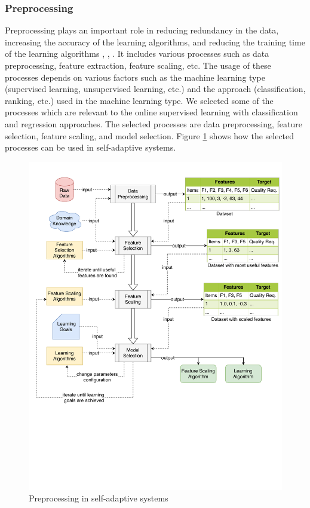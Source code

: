 \documentclass[a4paper,12pt]{article}
\begin{document}
\subsubsection{Preprocessing} 
Preprocessing plays an important role in reducing redundancy in the data, increasing the accuracy of the learning algorithms, and reducing the training time of the learning algorithms \cite{HOMLWSLATF-2017}, \cite{SLMLIP-2011}, \cite{LSLMLIP-2013}. It includes various processes such as data preprocessing, feature extraction, feature scaling, etc. The usage of these processes depends on various factors such as the machine learning type (supervised learning, unsupervised learning, etc.) and the approach (classification, ranking, etc.) used in the machine learning type. We selected some of the processes which are relevant to the online supervised learning with classification and regression approaches. The selected processes are data preprocessing, feature selection, feature scaling, and model selection. Figure \ref{Preprocessing} shows how the selected processes can be used in self-adaptive systems.
\begin{figure}[H]
	\centering
	\includegraphics[keepaspectratio, width=\linewidth]{figures/Preprocessing.pdf}
	\caption{Preprocessing in self-adaptive systems}
	\label{Preprocessing}
\end{figure}
\end{document}
